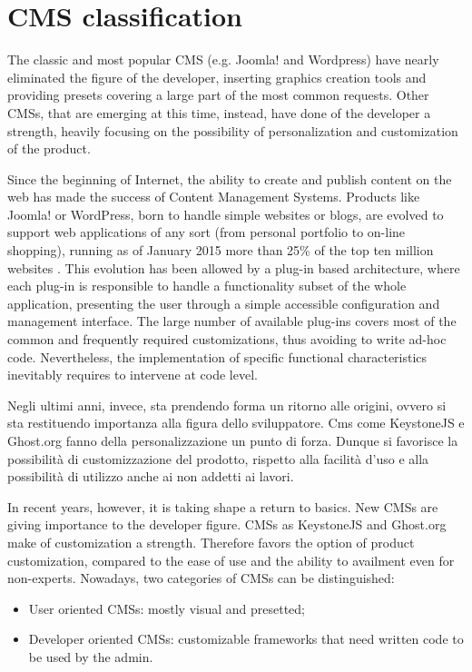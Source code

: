 \section{CMS classification}
\label{sec:CMS_class}

The classic and most popular CMS (e.g. Joomla! and Wordpress) have nearly eliminated the figure of the developer, inserting graphics creation tools and providing presets covering a large part of the most common requests. Other CMSs, that are emerging at this time, instead, have done of the developer a strength, heavily focusing on the possibility of personalization and customization of the product.

Since the beginning of Internet, the ability to create and publish content on the web has made the success of Content Management Systems. Products like Joomla! or WordPress, born to handle simple websites or blogs, are evolved to support web applications of any sort (from personal portfolio to on-line shopping), running as of January 2015 more than 25\% of the top ten million websites \cite{cms_stats}. This evolution has been allowed by a plug-in based architecture, where each plug-in is responsible to handle a functionality subset of the whole application, presenting the user through a simple accessible configuration and management interface.
The large number of available plug-ins covers most of the common and frequently required customizations, thus avoiding to write ad-hoc code. Nevertheless, the implementation of specific functional characteristics inevitably requires to intervene at code level.

Negli ultimi anni, invece, sta prendendo forma un ritorno alle origini, ovvero si sta restituendo importanza alla figura dello sviluppatore. Cms come KeystoneJS e Ghost.org fanno della personalizzazione un punto di forza.
Dunque si favorisce la possibilità di customizzazione del prodotto, rispetto alla facilità d'uso e alla possibilità di utilizzo anche ai non addetti ai lavori. 

In recent years, however, it is taking shape a return to basics. New CMSs are giving importance to the developer figure. CMSs as KeystoneJS and Ghost.org make of customization a strength.
Therefore favors the option of product customization, compared to the ease of use and the ability to availment even for non-experts.
Nowadays, two categories of CMSs can be distinguished:
\begin{itemize}
\item User oriented CMSs: mostly visual and presetted;
\item Developer oriented CMSs: customizable frameworks that need written code to be used by the admin.
\end{itemize}